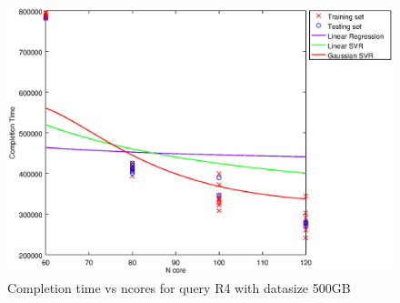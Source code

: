 
\begin {figure}[hbtp]
\centering
\includegraphics[width=\textwidth]{output/R4_500_1_OVER_NCORES/plot_R4_500_bestmodels.eps}
\caption{Completion time vs ncores for query R4 with datasize 500GB}
\label{fig:all_nonlinear_R4_500}
\end {figure}
